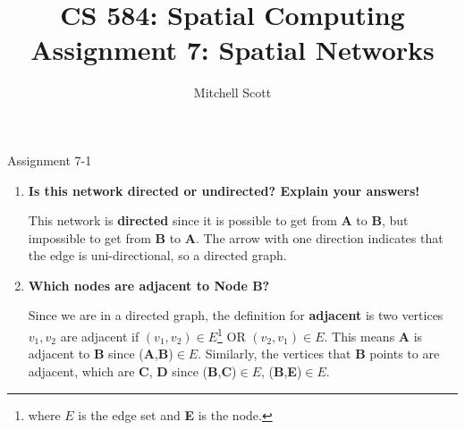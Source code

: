 \documentclass{beamer}
\title{CS 584: Spatial Computing Assignment 7: Spatial Networks}
\author{Mitchell Scott}
\institute{Emory University}
\begin{document}
\begin{frame}[plain]
    \maketitle
\end{frame}
\begin{frame}[allowframebreaks]{Assignment 7-1}
	\begin{center}
	\end{center}
	\begin{enumerate}
		\item {\bf Is this network directed or undirected? Explain your answers!}
		\begin{solution}
			This network is \textbf{directed} since it is possible to get from \textbf{A} to \textbf{B}, but impossible to get from \textbf{B} to \textbf{A}. The arrow with one direction indicates that the edge is uni-directional, so a directed graph.
		\end{solution}
		\item {\bf Which nodes are adjacent to Node B?}
		\begin{solution}
			Since we are in a directed graph, the definition for \textbf{adjacent} is two vertices $v_1, v_2$ are adjacent if $(v_1,v_2)\in E$\footnote{where $E$ is the edge set and \textbf{E} is the node.} OR $(v_2,v_1)\in E$. This means \textbf{A} is adjacent to \textbf{B} since (\textbf{A},\textbf{B})$\in E$. Similarly, the vertices that \textbf{B} points to are adjacent, which are \textbf{C}, \textbf{D} since (\textbf{B},\textbf{C})$\in E$, (\textbf{B},\textbf{E})$\in E$. \\
			

\end{solution}
\end{enumerate}
\end{frame}
\end{document}
